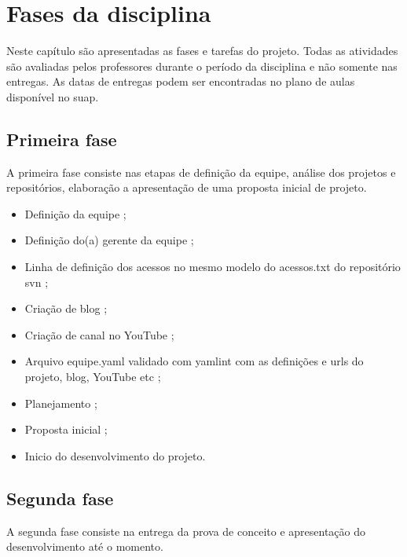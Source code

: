 \chapter{Fases da disciplina}
\label{fases-da-disciplina}
Neste capítulo são apresentadas as fases e tarefas do projeto. Todas as atividades são avaliadas pelos professores durante o período da disciplina e não somente nas entregas. 
As datas de entregas podem ser encontradas no plano de aulas disponível no \ac{suap}.


\section{Primeira fase}
A primeira fase consiste nas etapas de definição da equipe, análise dos projetos e repositórios, elaboração a apresentação de uma proposta inicial de projeto. 

\begin{itemize}
    \item Definição da equipe ;
    
    \item Definição do(a) gerente da equipe ;
    
    \item Linha de definição dos acessos no mesmo modelo do acessos.txt do repositório \gls{svn} ;
    
    \item Criação de blog ;
    
    \item Criação de canal no YouTube ;
    
    \item Arquivo equipe.yaml validado com yamlint com as definições e urls do projeto, blog, YouTube etc ;
    
    \item Planejamento ;
    
    \item Proposta inicial ;
    
    \item Inicio do desenvolvimento do projeto.
\end{itemize}


\section{Segunda fase}
A segunda fase consiste na entrega da prova de conceito e apresentação do desenvolvimento até o momento.

